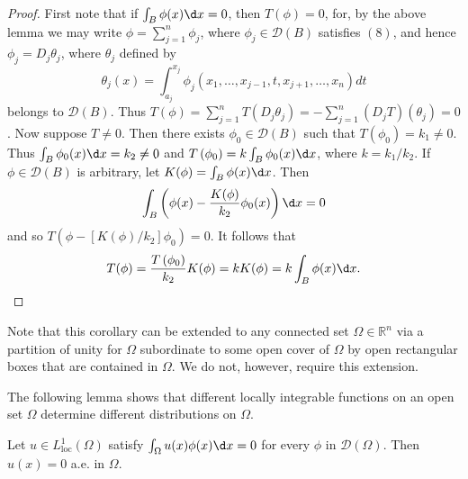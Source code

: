 \begin{proof}
  First note that if $\int_B \phi(x) \d x=0$, then $T(\phi)=0$, for, by the above lemma we may write $\phi=\sum_{j=1}^n \phi_j$, where $\phi_j \in \mathscr{D}(B)$ satisfies $(8)$, and hence $\phi_j=D_j \theta_j$, where $\theta_j$ defined by
  \[
  \theta_j(x)=\int_{a_j}^{x_j} \phi_j\left(x_1, \ldots, x_{j-1}, t, x_{j+1}, \ldots, x_n\right) d t
  \]
  belongs to $\mathscr{D}(B)$. Thus $T(\phi)=\sum_{j=1}^n T\left(D_j \theta_j\right)=-\sum_{j=1}^n\left(D_j T\right)\left(\theta_j\right)=0$.
  Now suppose $T \neq 0$. Then there exists $\phi_0 \in \mathscr{D}(B)$ such that $T\left(\phi_0\right)=k_1 \neq 0$. Thus $\int_B \phi_0(x) \d x=k_2 \neq 0$ and $T\left(\phi_0\right)=k \int_B \phi_0(x) \d x$, where $k=k_1 / k_2$. If $\phi \in \mathscr{D}(B)$ is arbitrary, let $K(\phi)=\int_B \phi(x) \d x$. Then
  \[
  \int_B\left(\phi(x)-\frac{K(\phi)}{k_2} \phi_0(x)\right) \d x=0
  \]
  and so $T\left(\phi-\left[K(\phi) / k_2\right] \phi_0\right)=0$. It follows that
  \[
  T(\phi)=\frac{T\left(\phi_0\right)}{k_2} K(\phi)=k K(\phi)=k \int_B \phi(x) \d x .
  \]
\end{proof}

Note that this corollary can be extended to any connected set $\Omega \in \mathbb{R}^n$ via a partition of unity for $\Omega$ subordinate to some open cover of $\Omega$ by open rectangular boxes that are contained in $\Omega$. We do not, however, require this extension.

The following lemma shows that different locally integrable functions on an open set $\Omega$ determine different distributions on $\Omega$.

\begin{lemma}
  Let $u \in L_{\mathrm{loc}}^1(\Omega)$ satisfy $\int_{\Omega} u(x) \phi(x) \d x=0$ for every $\phi$ in $\mathscr{D}(\Omega)$. Then $u(x)=0$ a.e. in $\Omega$.
\end{lemma}


